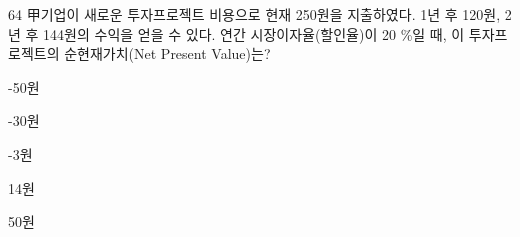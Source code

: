\begin{question}{64}
甲기업이 새로운 투자프로젝트 비용으로 현재 250원을 지출하였다. 1년 후 120원, 2년 후 144원의 수익을 얻을 수 있다. 연간 시장이자율(할인율)이 20 \%일 때, 이 투자프로젝트의 순현재가치(Net Present Value)는?
\begin{choices}
  \item -50원
  \item -30원
  \item -3원
  \item 14원
  \item 50원
\end{choices}
\end{question}
